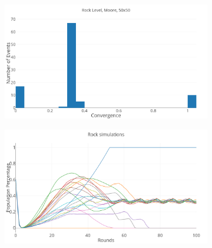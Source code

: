\documentclass[a4paper, 11pt]{article}
\begin{document}
\newpage

\begin{figure}[H]
	\begin{subfigure}{0.52\textwidth}
		\includegraphics[width=1\linewidth]{50x50_60RockDist_RockHG}
	\end{subfigure}%
	\begin{subfigure}{0.52\textwidth}
		\includegraphics[width=1\linewidth]{50x50_60RockDist_IndividualRock}
	\end{subfigure}
	

\end{figure}
\end{document}
